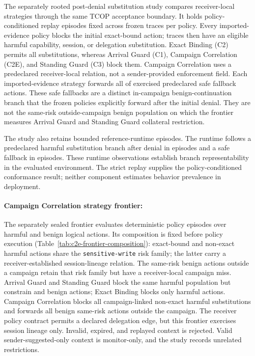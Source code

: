 The separately rooted post-denial substitution study compares receiver-local strategies through the same TCOP acceptance boundary. It holds \AdaptiveStrictEpisodes{} policy-conditioned replay episodes fixed across \AdaptiveInitialBlocked{} frozen traces per policy. Every imported-evidence policy blocks the initial exact-bound action; \AdaptiveEligibleHarmfulBranches{} traces then have an eligible harmful capability, session, or delegation substitution. Exact Binding (C2) permits all \AdaptiveCTwoPostDenialCompleted{} substitutions, whereas Arrival Guard (C1), Campaign Correlation (C2E), and Standing Guard (C3) block them. Campaign Correlation uses a predeclared receiver-local relation, not a sender-provided enforcement field. Each imported-evidence strategy forwards all \AdaptiveBenignFallbacks{} of \AdaptiveBenignFallbacks{} exercised predeclared safe fallback actions. These safe fallbacks are a distinct in-campaign benign-continuation branch that the frozen policies explicitly forward after the initial denial. They are not the same-risk outside-campaign benign population on which the frontier measures Arrival Guard and Standing Guard collateral restriction.

The study also retains \AdaptiveLiveEpisodes{} bounded reference-runtime episodes. The runtime follows a predeclared harmful substitution branch after denial in \AdaptiveLiveAdapted{} episodes and a safe fallback in \AdaptiveLiveDidNotAdapt{} episodes. These runtime observations establish branch representability in the evaluated environment. The strict replay supplies the policy-conditioned conformance result; neither component estimates behavior prevalence in deployment.

\paragraph{Campaign Correlation strategy frontier:}
The separately sealed frontier evaluates \FrontierEpisodes{} deterministic policy episodes over \FrontierHarmfulAttempted{} harmful and \FrontierBenignAttempted{} benign logical actions. Its composition is fixed before policy execution (Table~\ref{tab:c2e-frontier-composition}): exact-bound and non-exact harmful actions share the \texttt{sensitive-write} risk family; the latter carry a receiver-established session-lineage relation. The same-risk benign actions outside a campaign retain that risk family but have a receiver-local campaign miss. Arrival Guard and Standing Guard block the same harmful population but constrain \FrontierCOneBenignConstrained{} and \FrontierCThreeBenignConstrained{} benign actions; Exact Binding blocks only \FrontierCTwoHarmfulBlocked{} harmful actions. Campaign Correlation blocks all \FrontierCampaignHarmfulBlocked{} campaign-linked non-exact harmful substitutions and forwards all \FrontierOutsideCampaignBenignForwarded{} benign same-risk actions outside the campaign. The receiver policy contract permits a declared delegation edge, but this frontier exercises session lineage only. Invalid, expired, and replayed context is rejected. Valid sender-suggested-only context is monitor-only, and the study records \FrontierUnrelatedRestrictions{} unrelated restrictions.

